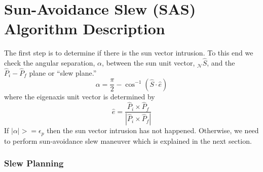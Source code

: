 \documentclass[letterpaper, paper,12pt]{AAS}		%
\begin{document}
\section{Sun-Avoidance Slew (SAS) Algorithm Description} 
	The first step is to determine if there is the sun vector intrusion. To this end we check the angular separation, $\alpha$, between the sun unit vector, $_\mathcal{N}\hat{S}$, and the $\hat{P}_i-\hat{P}_f$ plane or ``slew plane.''
		\begin{equation}
		\alpha=\frac{\pi}{2}-\cos^{-1}(\hat{S}\cdot\hat{e})
		\end{equation}
		where the eigenaxis unit vector is determined by
		\begin{equation}\label{eaxis}
		\hat{e}=\frac{\hat{P}_i\times\hat{P}_f}{|\hat{P}_i\times \hat{P}_f|}
		\end{equation} 
If $|\alpha|>=\epsilon_p$ then the sun vector intrusion has not happened. Otherwise, we need to perform sun-avoidance slew maneuver which is explained in the next section.
	
	
	
	\subsubsection{Slew Planning}
\end{document}

